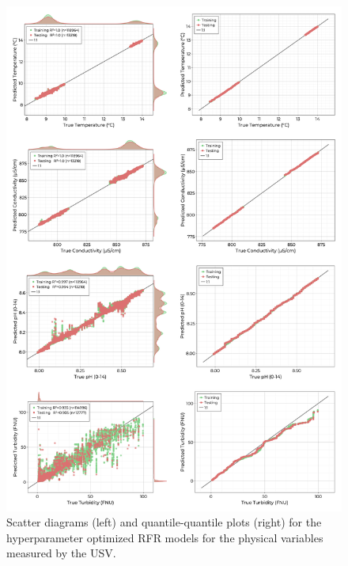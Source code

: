\documentclass[remotesensing,article,submit,pdftex,moreauthors]{Definitions/mdpi}
\begin{document}
\begin{figure}[h!]
\centering
\includegraphics[width=0.9\columnwidth]{paper/figures/results/fits/physical-fitres.png}
\caption{Scatter diagrams (left) and quantile-quantile plots (right) for the hyperparameter optimized RFR models for the physical variables measured by the USV.\label{fig:physical-fit}}
\end{figure}  

\pagebreak
\end{document}
